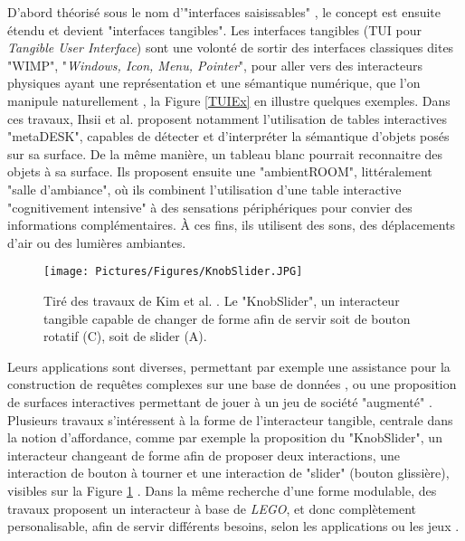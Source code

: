 			D'abord théorisé sous le nom d'"interfaces saisissables" \cite{fitzmaurice_bricks_1995}, le concept est ensuite étendu et devient "interfaces tangibles". Les interfaces tangibles (TUI pour \textit{Tangible User Interface}) sont une volonté de sortir des interfaces classiques dites "WIMP", "\textit{Windows, Icon, Menu, Pointer}", pour aller vers des interacteurs physiques ayant une représentation et une sémantique numérique, que l'on manipule naturellement \cite{ishii_tangible_1997}, la Figure \ref{TUIEx} en illustre quelques exemples. Dans ces travaux, Ihsii et al. \cite{ishii_tangible_1997} proposent notamment l'utilisation de tables interactives "metaDESK", capables de détecter et d'interpréter la sémantique d'objets posés sur sa surface. De la même manière, un tableau blanc pourrait reconnaitre des objets à sa surface. Ils proposent ensuite une "ambientROOM", littéralement "salle d'ambiance", où ils combinent l'utilisation d'une table interactive "cognitivement intensive" à des sensations périphériques pour convier des informations complémentaires. À ces fins, ils utilisent des sons, des déplacements d'air ou des lumières ambiantes.
			
			\begin{figure}
			\centering
			\texttt{[image: Pictures/Figures/KnobSlider.JPG]}
			\caption{Tiré des travaux de Kim et al. \cite{kim_knobslider_2019}. Le "KnobSlider", un interacteur tangible capable de changer de forme afin de servir soit de bouton rotatif (C), soit de slider (A).}
			\label{KnobSlider}
		\end{figure}
			
			Leurs applications sont diverses, permettant par exemple une assistance pour la construction de requêtes complexes sur une base de données \cite{pereda_tui_2019}, ou une proposition de surfaces interactives permettant de jouer à un jeu de société "augmenté" \cite{villar_project_2018}. Plusieurs travaux s'intéressent à la forme de l'interacteur tangible, centrale dans la notion d'affordance, comme par exemple la proposition du "KnobSlider", un interacteur changeant de forme afin de proposer deux interactions, une interaction de bouton à tourner et une interaction de "slider" (bouton glissière), visibles sur la Figure \ref{KnobSlider} \cite{kim_knobslider_2019}. Dans la même recherche d'une forme modulable, des travaux proposent un interacteur à base de \textit{LEGO}, et donc complètement personalisable, afin de servir différents besoins, selon les applications ou les jeux \cite{arora_virtualbricks_2019}.
				
